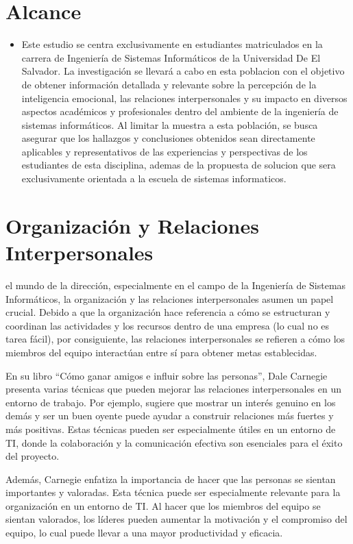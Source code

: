 \documentclass[journal]{IEEEtran}
\begin{document}
\section{Alcance}
\begin{itemize}
	\item Este estudio se centra exclusivamente en estudiantes matriculados en la carrera de Ingeniería de Sistemas Informáticos de la Universidad De El Salvador. La investigación se llevará a cabo en esta poblacion con el objetivo de obtener información detallada y relevante sobre la percepción de la inteligencia emocional, las relaciones interpersonales  y su impacto en diversos aspectos académicos y profesionales dentro del ambiente de la ingeniería de sistemas informáticos. Al limitar la muestra a esta población, se busca asegurar que los hallazgos y conclusiones obtenidos sean directamente aplicables y representativos de las experiencias y perspectivas de los estudiantes de esta disciplina, ademas de la propuesta de solucion que sera exclusivamente orientada a la escuela de sistemas informaticos.
\end{itemize}
\section{Organización y Relaciones Interpersonales}
 el mundo de la dirección, especialmente en el campo de la Ingeniería de Sistemas Informáticos, la organización y las relaciones interpersonales asumen un papel crucial. Debido a que la organización hace referencia a cómo se estructuran y coordinan las actividades y los recursos dentro de una empresa (lo cual no es tarea fácil), por consiguiente, las relaciones interpersonales se refieren a cómo los miembros del equipo interactúan entre sí para obtener metas establecidas.

En su libro “Cómo ganar amigos e influir sobre las personas”, Dale Carnegie presenta varias técnicas que pueden mejorar las relaciones interpersonales en un entorno de trabajo. Por ejemplo, sugiere que mostrar un interés genuino en los demás y ser un buen oyente puede ayudar a construir relaciones más fuertes y más positivas. Estas técnicas pueden ser especialmente útiles en un entorno de TI, donde la colaboración y la comunicación efectiva son esenciales para el éxito del proyecto.

Además, Carnegie enfatiza la importancia de hacer que las personas se sientan importantes y valoradas. Esta técnica puede ser especialmente relevante para la organización en un entorno de TI. Al hacer que los miembros del equipo se sientan valorados, los líderes pueden aumentar la motivación y el compromiso del equipo, lo cual puede llevar a una mayor productividad y eficacia.
\end{document}
